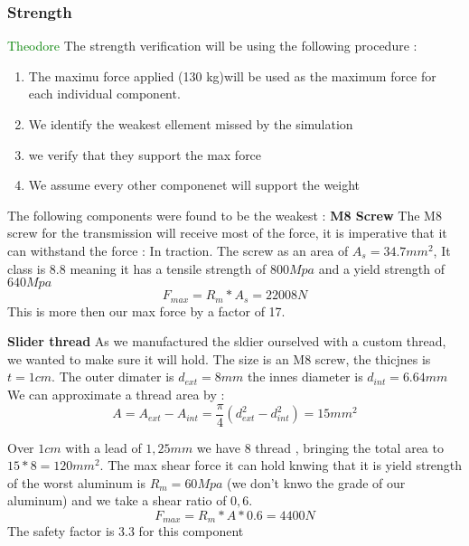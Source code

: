 \documentclass[lettersize,journal]{IEEEtran}
\begin{document}
\bigskip


\subsubsection{Strength} \label{section:Strength}\textcolor{green}{Theodore}
The strength verification will be using the following procedure : 
\begin{enumerate}
    \item The maximu force applied (130 kg)will be used as the maximum force for each individual component. 
    \item We identify the weakest ellement missed by the simulation
    \item we verify that they support the max force
    \item We assume every other componenet will support the weight
\end{enumerate}

The following components were found to be the weakest : 
\textbf{M8 Screw}
The M8 screw for the transmission will receive most of the force, it is imperative that it can withstand the force : 
In traction. The screw as an area of $A_s = 34.7 mm^2$, It class is 8.8 meaning it has a tensile strength of $800Mpa$ and a yield strength of $640 Mpa$ 
\begin{equation*}
    F_{max} = R_m*A_s = 22 008 N 
\end{equation*}
This is more then our max force by a factor of 17. 

\textbf{Slider thread}
As we manufactured the sldier ourselved with a custom thread, we wanted to make sure it will hold. The size is an M8 screw, the thicjnes  is $t = 1 cm$. The outer dimater is $d_{ext} = 8mm$ the innes diameter is $d_{int} = 6.64 mm $
We can approximate a thread area by : 
\begin{equation*}
    A = A_{ext} - A_{int} = \frac{\pi}{4} (d_{ext}^2 - d_{int}^2) = 15 mm^2
\end{equation*}

Over $1cm$ with a lead of $1,25 mm $ we have $8$ thread , bringing the total area to $15*8 = 120 mm^2$. 
The max shear force it can hold knwing that it is yield strength of the worst aluminum is $R_m = 60 Mpa $ (we don't knwo the grade of our aluminum) and we take a shear ratio of $0,6$. 
\begin{equation*}
    F_{max} = R_m*A * 0.6 = 4400 N 
\end{equation*}
The safety factor is 3.3 for this component 
\end{document}
